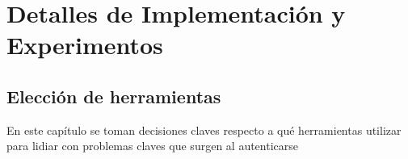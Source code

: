 \chapter{Detalles de Implementación y Experimentos}\label{chapter:implementation}

\section*{Elección de herramientas}
En este capítulo se toman decisiones claves respecto a qué herramientas utilizar para lidiar con problemas claves que surgen al autenticarse

%
%



